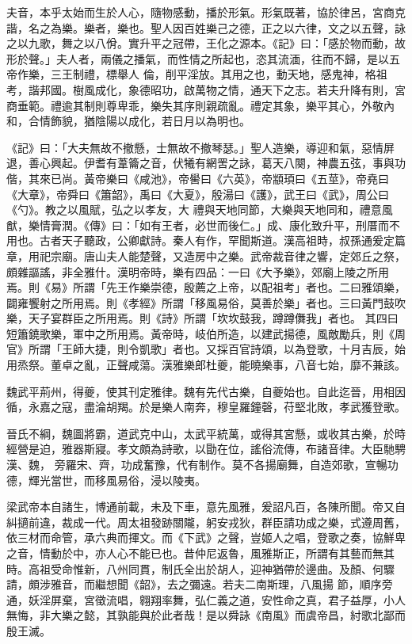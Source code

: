 
\begin{pinyinscope}

 夫音，本乎太始而生於人心，隨物感動，播於形氣。形氣既著，協於律呂，宮商克諧，名之為樂。樂者，樂也。聖人因百姓樂己之德，正之以六律，文之以五聲，詠之以九歌，舞之以八佾。實升平之冠帶，王化之源本。《記》曰：「感於物而動，故形於聲。」夫人者，兩儀之播氣，而性情之所起也，恣其流湎，往而不歸，是以五帝作樂，三王制禮，標舉人
 倫，削平淫放。其用之也，動天地，感鬼神，格祖考，諧邦國。樹風成化，象德昭功，啟萬物之情，通天下之志。若夫升降有則，宮商垂範。禮逾其制則尊卑乖，樂失其序則親疏亂。禮定其象，樂平其心，外敬內和，合情飾貌，猶陰陽以成化，若日月以為明也。



 《記》曰：「大夫無故不撤懸，士無故不撤琴瑟。」聖人造樂，導迎和氣，惡情屏退，善心興起。伊耆有葦籥之音，伏犧有網罟之詠，葛天八闋，神農五弦，事與功偕，其來已尚。黃帝樂曰《咸池》，帝嚳曰《六英》，帝顓頊曰《五莖》，帝堯曰《大章》，帝舜曰《簫韶》，禹曰《大夏》，殷湯曰《護》，武王曰《武》，周公曰《勺》。教之以風賦，弘之以孝友，大
 禮與天地同節，大樂與天地同和，禮意風猷，樂情膏潤。《傳》曰：「如有王者，必世而後仁。」成、康化致升平，刑厝而不用也。古者天子聽政，公卿獻詩。秦人有作，罕聞斯道。漢高祖時，叔孫通爰定篇章，用祀宗廟。唐山夫人能楚聲，又造房中之樂。武帝裁音律之響，定郊丘之祭，頗雜謳謠，非全雅什。漢明帝時，樂有四品：一曰《大予樂》，郊廟上陵之所用焉。則《易》所謂「先王作樂崇德，殷薦之上帝，以配祖考」者也。二曰雅頌樂，闢雍饗射之所用焉。則《孝經》所謂「移風易俗，莫善於樂」者也。三曰黃門鼓吹樂，天子宴群臣之所用焉。則《詩》所謂「坎坎鼓我，蹲蹲儛我」者也。
 其四曰短簫鐃歌樂，軍中之所用焉。黃帝時，岐伯所造，以建武揚德，風敵勵兵，則《周官》所謂「王師大捷，則令凱歌」者也。又採百官詩頌，以為登歌，十月吉辰，始用烝祭。董卓之亂，正聲咸蕩。漢雅樂郎杜夔，能曉樂事，八音七始，靡不兼該。



 魏武平荊州，得夔，使其刊定雅律。魏有先代古樂，自夔始也。自此迄晉，用相因循，永嘉之寇，盡淪胡羯。於是樂人南奔，穆皇羅鐘磬，苻堅北敗，孝武獲登歌。



 晉氏不綱，魏圖將霸，道武克中山，太武平統萬，或得其宮懸，或收其古樂，於時經營是迫，雅器斯寢。孝文頗為詩歌，以勖在位，謠俗流傳，布諸音律。大臣馳騁漢、魏，
 旁羅宋、齊，功成奮豫，代有制作。莫不各揚廟舞，自造郊歌，宣暢功德，輝光當世，而移風易俗，浸以陵夷。



 梁武帝本自諸生，博通前載，未及下車，意先風雅，爰詔凡百，各陳所聞。帝又自糾擿前違，裁成一代。周太祖發跡關隴，躬安戎狄，群臣請功成之樂，式遵周舊，依三材而命管，承六典而揮文。而《下武》之聲，豈姬人之唱，登歌之奏，協鮮卑之音，情動於中，亦人心不能已也。昔仲尼返魯，風雅斯正，所謂有其藝而無其時。高祖受命惟新，八州同貫，制氏全出於胡人，迎神猶帶於邊曲。及顏、何驟請，頗涉雅音，而繼想聞《韶》，去之彌遠。若夫二南斯理，八風揚
 節，順序旁通，妖淫屏棄，宮徵流唱，翱翔率舞，弘仁義之道，安性命之真，君子益厚，小人無悔，非大樂之懿，其孰能與於此者哉！是以舜詠《南風》而虞帝昌，紂歌北鄙而殷王滅。




\end{pinyinscope}
